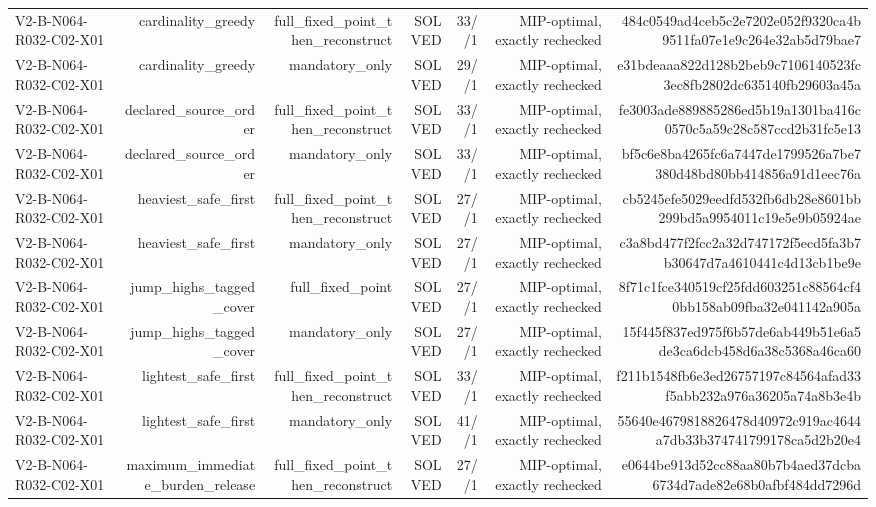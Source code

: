 {\begin{longtable}{lrrrrrr}
V2-B-N064-R032-C02-X01 & cardinality\_greedy & full\_fixed\_point\_then\_reconstruct & SOLVED & 33//1 & MIP-optimal, exactly rechecked & 484c0549ad4ceb5c2e7202e052f9320ca4b9511fa07e1e9c264e32ab5d79bae7 \\
V2-B-N064-R032-C02-X01 & cardinality\_greedy & mandatory\_only & SOLVED & 29//1 & MIP-optimal, exactly rechecked & e31bdeaaa822d128b2beb9c7106140523fc3ec8fb2802dc635140fb29603a45a \\
V2-B-N064-R032-C02-X01 & declared\_source\_order & full\_fixed\_point\_then\_reconstruct & SOLVED & 33//1 & MIP-optimal, exactly rechecked & fe3003ade889885286ed5b19a1301ba416c0570c5a59c28c587ccd2b31fc5e13 \\
V2-B-N064-R032-C02-X01 & declared\_source\_order & mandatory\_only & SOLVED & 33//1 & MIP-optimal, exactly rechecked & bf5c6e8ba4265fc6a7447de1799526a7be7380d48bd80bb414856a91d1eec76a \\
V2-B-N064-R032-C02-X01 & heaviest\_safe\_first & full\_fixed\_point\_then\_reconstruct & SOLVED & 27//1 & MIP-optimal, exactly rechecked & cb5245efe5029eedfd532fb6db28e8601bb299bd5a9954011c19e5e9b05924ae \\
V2-B-N064-R032-C02-X01 & heaviest\_safe\_first & mandatory\_only & SOLVED & 27//1 & MIP-optimal, exactly rechecked & c3a8bd477f2fcc2a32d747172f5ecd5fa3b7b30647d7a4610441c4d13cb1be9e \\
V2-B-N064-R032-C02-X01 & jump\_highs\_tagged\_cover & full\_fixed\_point & SOLVED & 27//1 & MIP-optimal, exactly rechecked & 8f71c1fce340519cf25fdd603251c88564cf40bb158ab09fba32e041142a905a \\
V2-B-N064-R032-C02-X01 & jump\_highs\_tagged\_cover & mandatory\_only & SOLVED & 27//1 & MIP-optimal, exactly rechecked & 15f445f837ed975f6b57de6ab449b51e6a5de3ca6dcb458d6a38c5368a46ca60 \\
V2-B-N064-R032-C02-X01 & lightest\_safe\_first & full\_fixed\_point\_then\_reconstruct & SOLVED & 33//1 & MIP-optimal, exactly rechecked & f211b1548fb6e3ed26757197c84564afad33f5abb232a976a36205a74a8b3e4b \\
V2-B-N064-R032-C02-X01 & lightest\_safe\_first & mandatory\_only & SOLVED & 41//1 & MIP-optimal, exactly rechecked & 55640e4679818826478d40972c919ac4644a7db33b374741799178ca5d2b20e4 \\
V2-B-N064-R032-C02-X01 & maximum\_immediate\_burden\_release & full\_fixed\_point\_then\_reconstruct & SOLVED & 27//1 & MIP-optimal, exactly rechecked & e0644be913d52cc88aa80b7b4aed37dcba6734d7ade82e68b0afbf484dd7296d \\

\end{longtable}}
